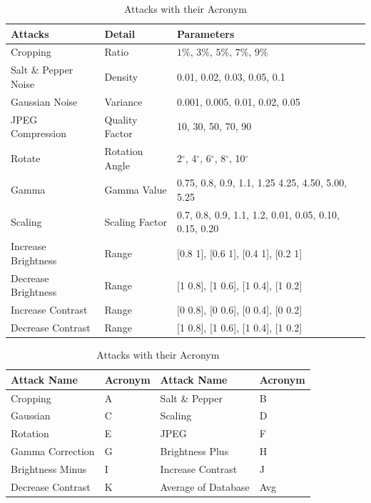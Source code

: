 \documentclass[12pt,a4paper]{jihmsp}
\begin{document}
{{\begin{table} [h]
	\begin{tabular}{|p{2.9cm}|p{2.6cm}|p{6.9cm}|}
		\hline \textbf{Attacks} & \textbf{Detail} &  \textbf{Parameters} \\ 
		\hline Cropping	 & Ratio &	$1\%$, $3\%$, $5\%$, $7\%$, $9\%$  \\
		\hline Salt \& Pepper Noise & Density	& 0.01, 0.02, 0.03, 0.05, 0.1\\
		\hline Gaussian Noise &	Variance & 0.001, 0.005, 0.01, 0.02, 0.05\\
		\hline JPEG Compression	& Quality Factor & 10, 30, 50, 70, 90\\
		\hline Rotate &	Rotation Angle&	2$^{\circ}$, 4$^{\circ}$, 6$^{\circ}$, 8$^{\circ}$, 10$^{\circ}$ \\
		\hline Gamma  & Gamma Value	& 0.75, 0.8, 0.9, 1.1, 1.25  4.25, 4.50, 5.00, 5.25 \\
		\hline Scaling & Scaling Factor & 0.7, 0.8, 0.9, 1.1, 1.2, 0.01, 0.05, 0.10, 0.15, 0.20 \\
		\hline Increase Brightness & Range  &	[0.8 1], [0.6 1], [0.4 1], [0.2 1]\\
		\hline Decrease Brightness & Range  & [1 0.8], [1 0.6], [1 0.4], [1 0.2]\\
		\hline Increase Contrast & Range   & [0 0.8], [0 0.6], [0 0.4], [0 0.2]\\
		\hline Decrease Contrast & Range & [1 0.8], [1 0.6], [1 0.4], [1 0.2] \\
		\hline 
	\end{tabular} 
	\vspace{5mm}
	\captionsetup[table]{skip=10pt,justification=centering}
	\caption{Attacks with their Acronym}
	\centering
	\begin{tabular}{|p{2.9cm}|p{1.4cm}|p{2.9cm}|p{1.4cm}|}
		\hline \textbf{Attack Name}	 &  \textbf{Acronym}  & \textbf{Attack Name}  &  \textbf{Acronym}\\ 
		\hline Cropping & A &   Salt \& Pepper & B \\ 
		\hline Gaussian & C &   Scaling & D \\ 
		\hline Rotation & E &   JPEG & F \\ 
		\hline Gamma Correction & G &   Brightness Plus & H \\ 
		\hline Brightness Minus & I &   Increase Contrast & J \\ 
		\hline Decrease Contrast & K &  Average of Database & Avg \\ 

\end{tabular}
\end{table}}}
\end{document}
